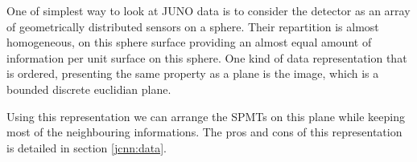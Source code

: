 
One of simplest way to look at JUNO data is to consider the detector as an array of geometrically distributed sensors on a sphere. Their repartition is almost homogeneous, on this sphere surface providing an almost equal amount of information per unit surface on this sphere. One kind of data representation that is ordered, presenting the same property as a plane is the image, which is a bounded discrete euclidian plane.

Using this representation we can arrange the SPMTs on this plane while keeping most of the neighbouring informations. The pros and cons of this representation is detailed in section \ref{jcnn:data}.


